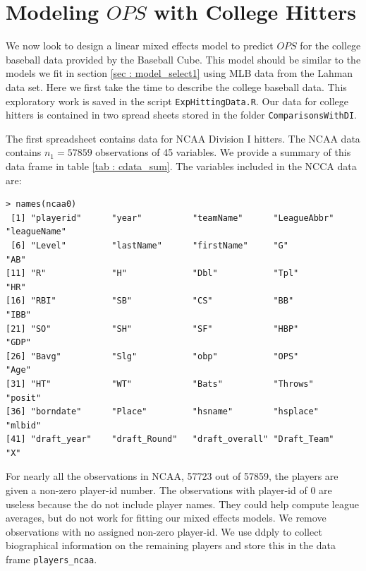 \documentclass [52pt] {article}
\begin{document}
\section{Modeling $OPS$ with College Hitters}
We now look to design a  linear mixed effects model to predict $OPS$ for the college baseball data provided by the Baseball Cube.  This model should be similar to the models we fit in section  \ref{sec : model_select1} using MLB data from the Lahman data set.  Here we first take the time to describe the college baseball data.  This exploratory work is saved in the script \verb|ExpHittingData.R|.  Our data for college hitters is contained in two spread sheets stored in the folder \verb|ComparisonsWithDI|.  

The first spreadsheet contains data for NCAA Division I hitters.  The NCAA data contains $n_1 = 57859$ observations of 45 variables.  We provide a summary of this data frame in table \ref{tab : cdata_sum}.  The variables included in the NCCA data are:
\begin{verbatim}
> names(ncaa0)
 [1] "playerid"      "year"          "teamName"      "LeagueAbbr"    "leagueName"   
 [6] "Level"         "lastName"      "firstName"     "G"             "AB"           
[11] "R"             "H"             "Dbl"           "Tpl"           "HR"           
[16] "RBI"           "SB"            "CS"            "BB"            "IBB"          
[21] "SO"            "SH"            "SF"            "HBP"           "GDP"          
[26] "Bavg"          "Slg"           "obp"           "OPS"           "Age"          
[31] "HT"            "WT"            "Bats"          "Throws"        "posit"        
[36] "borndate"      "Place"         "hsname"        "hsplace"       "mlbid"        
[41] "draft_year"    "draft_Round"   "draft_overall" "Draft_Team"    "X"  
\end{verbatim}
For nearly all the observations in NCAA, 57723 out of 57859, the players are given a non-zero player-id number.  The observations with player-id of 0 are useless because the do not include player names.  They could help compute league averages, but do not work for fitting our mixed effects models.  We remove observations with no assigned non-zero player-id.  We use ddply to collect biographical information on the remaining players and store this in the data frame \verb|players_ncaa|.  
\end{document}
